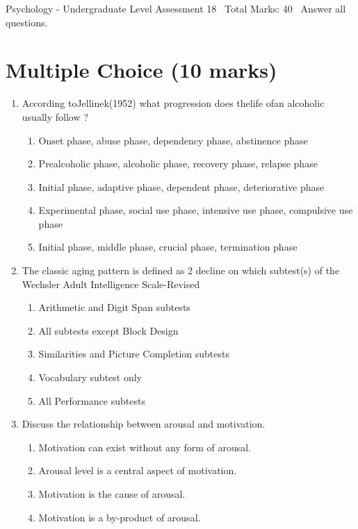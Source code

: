\documentclass[12pt]{article}
\begin{document}
\begin{center}
Psychology - Undergraduate Level Assessment 18 \
Total Marks: 40 \
Answer all questions.
\end{center}

\section*{Multiple Choice (10 marks)}
\begin{enumerate}[label=\arabic*.]
\item According toJellinek(1952) what progression does thelife ofan alcoholic usually follow ?
\begin{enumerate}[label=(\alph*)]
    \item Onset phase, abuse phase, dependency phase, abstinence phase
    \item Prealcoholic phase, alcoholic phase, recovery phase, relapse phase
    \item Initial phase, adaptive phase, dependent phase, deteriorative phase
    \item Experimental phase, social use phase, intensive use phase, compulsive use phase
    \item Initial phase, middle phase, crucial phase, termination phase
\end{enumerate}
\item The classic aging pattern is defined as 2 decline on which subtest(s) of the Wechsler Adult Intelligence Scale-Revised
\begin{enumerate}[label=(\alph*)]
    \item Arithmetic and Digit Span subtests
    \item All subtests except Block Design
    \item Similarities and Picture Completion subtests
    \item Vocabulary subtest only
    \item All Performance subtests
\end{enumerate}
\item Discuss the relationship between arousal and motivation.
\begin{enumerate}[label=(\alph*)]
    \item Motivation can exist without any form of arousal.
    \item Arousal level is a central aspect of motivation.
    \item Motivation is the cause of arousal.
    \item Motivation is a by-product of arousal.

\end{enumerate}
\end{enumerate}
\end{document}
